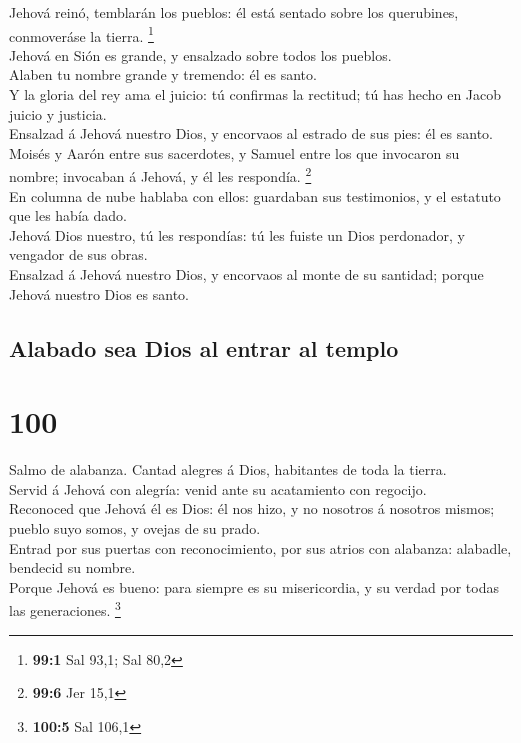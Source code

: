  Jehová reinó, temblarán los pueblos: él está sentado sobre
los querubines, conmoveráse la tierra. \footnote{\textbf{99:1} Sal 93,1;
  Sal 80,2}\\
 Jehová en Sión es grande, y ensalzado sobre todos los
pueblos.\\
 Alaben tu nombre grande y tremendo: él es santo.\\
 Y la gloria del rey ama el juicio: tú confirmas la
rectitud; tú has hecho en Jacob juicio y justicia.\\
 Ensalzad á Jehová nuestro Dios, y encorvaos al estrado de
sus pies: él es santo.\\
 Moisés y Aarón entre sus sacerdotes, y Samuel entre los que
invocaron su nombre; invocaban á Jehová, y él les respondía.
\footnote{\textbf{99:6} Jer 15,1}\\
 En columna de nube hablaba con ellos: guardaban sus
testimonios, y el estatuto que les había dado.\\
 Jehová Dios nuestro, tú les respondías: tú les fuiste un
Dios perdonador, y vengador de sus obras.\\
 Ensalzad á Jehová nuestro Dios, y encorvaos al monte de su
santidad; porque Jehová nuestro Dios es santo.

\hypertarget{alabado-sea-dios-al-entrar-al-templo}{%
\subsection{Alabado sea Dios al entrar al
templo}\label{alabado-sea-dios-al-entrar-al-templo}}

\hypertarget{section-99}{%
\section{100}\label{section-99}}

 Salmo de alabanza. Cantad alegres á Dios, habitantes de
toda la tierra.\\
 Servid á Jehová con alegría: venid ante su acatamiento con
regocijo.\\
 Reconoced que Jehová él es Dios: él nos hizo, y no nosotros
á nosotros mismos; pueblo suyo somos, y ovejas de su prado.\\
 Entrad por sus puertas con reconocimiento, por sus atrios
con alabanza: alabadle, bendecid su nombre.\\
 Porque Jehová es bueno: para siempre es su misericordia, y
su verdad por todas las generaciones. \footnote{\textbf{100:5} Sal 106,1}

